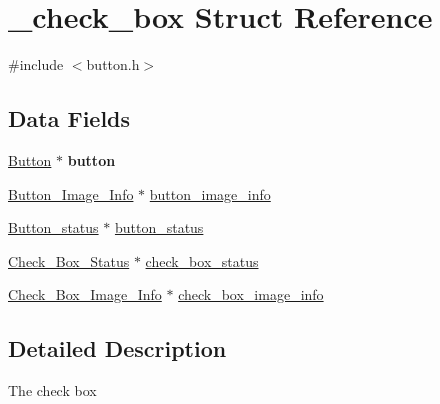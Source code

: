 \hypertarget{struct__check__box}{\section{\+\_\+check\+\_\+box Struct Reference}
\label{struct__check__box}
}


{\ttfamily \#include $<$button.\+h$>$}

\subsection*{Data Fields}
\begin{DoxyCompactItemize}
\item 
\hypertarget{struct__check__box_afcbb5b54142bac4e305b31cbebe41064}{\hyperlink{struct___button}{Button} $\ast$ {\bfseries button}}\label{struct__check__box_afcbb5b54142bac4e305b31cbebe41064}

\item 
\hyperlink{struct___button___image___info}{Button\+\_\+\+Image\+\_\+\+Info} $\ast$ \hyperlink{struct__check__box_abe7ec1033c8966c23ea31920649178bf}{button\+\_\+image\+\_\+info}
\item 
\hyperlink{struct__button__status}{Button\+\_\+status} $\ast$ \hyperlink{struct__check__box_af1ab6c7287e67a55a8e855e08302f8be}{button\+\_\+status}
\item 
\hyperlink{struct__check__box__status}{Check\+\_\+\+Box\+\_\+\+Status} $\ast$ \hyperlink{struct__check__box_ad26008f10118371ca26980a69e0c380b}{check\+\_\+box\+\_\+status}
\item 
\hyperlink{struct__check__box__image__info}{Check\+\_\+\+Box\+\_\+\+Image\+\_\+\+Info} $\ast$ \hyperlink{struct__check__box_a229649d419b5ff48d15261585e275619}{check\+\_\+box\+\_\+image\+\_\+info}
\end{DoxyCompactItemize}


\subsection{Detailed Description}
The check box 

